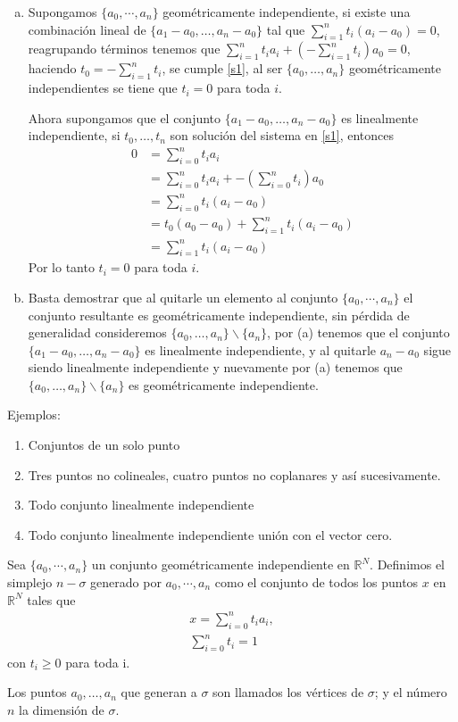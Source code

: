 \begin{Dem}
\begin{enumerate}[(a)]
\item Supongamos $\{a_0,\cdots,a_n\}$ geométricamente independiente, si existe una combinación lineal de $\{a_1-a_0,\ldots,a_n-a_0\}$ tal que $\sum_{i=1}^{n}t_i(a_i-a_0)=0$, reagrupando términos tenemos que $\sum_{i=1}^{n}t_ia_i + (-\sum_{i=1}^{n}t_i)a_0=0$, haciendo $t_0 = -\sum_{i=1}^{n}t_i$, se cumple \ref{s1}, al ser $\{a_0,\ldots,a_n\}$ geométricamente independientes se tiene que $t_i=0$ para toda $i$.

Ahora supongamos que el conjunto $\{a_1-a_0,\ldots,a_n-a_0\}$ es linealmente independiente, si $t_0,\ldots,t_n$ son solución del sistema en \ref{s1}, entonces 
\begin{align*}
 0&=\sum_{i=0}^{n}t_ia_i\\
 &=\sum_{i=0}^{n}t_ia_i + -(\sum_{i=0}^{n}t_i)a_0\\
 &=\sum_{i=0}^{n}t_i(a_i-a_0)\\ 
 &= t_0(a_0-a_0) + \sum_{i=1}^{n}t_i(a_i-a_0)\\
 &=\sum_{i=1}^{n}t_i(a_i-a_0)
\end{align*}
Por lo tanto $t_i=0$ para toda $i$.
\item Basta demostrar que al quitarle un elemento al conjunto $\{a_0,\cdots,a_n\}$
el conjunto resultante es geométricamente independiente, sin pérdida
de generalidad consideremos $\{a_0,\ldots,a_n\}\backslash\{a_n\}$, por (a) tenemos que el
conjunto $\{a_1-a_0,\ldots,a_n-a_0\}$ es linealmente independiente, y al quitarle
$a_n-a_0$ sigue siendo linealmente independiente y nuevamente por (a) 
tenemos que $\{a_0,\ldots,a_n\}\backslash\{a_n\}$ es geométricamente independiente.
\end{enumerate}
\end{Dem}
Ejemplos:
\begin{enumerate}
\item Conjuntos de un solo punto
\item Tres puntos no colineales, cuatro puntos no coplanares y así sucesivamente.  
\item Todo conjunto linealmente independiente
\item Todo conjunto linealmente independiente unión con el vector cero. 
\end{enumerate}

\begin{Defi}[Simplejo]
Sea $\{a_0,\cdots,a_n\}$ un conjunto geométricamente independiente en  $\mathbb{R}^{N}$. Definimos el simplejo  $n-\sigma$ generado por $a_0,\cdots,a_n$ como el conjunto de todos los puntos $x$ en $\mathbb{R}^{N}$ tales que 
\begin{equation}\label{s2}
\begin{split}
x = \sum_{i=0}^{n}t_ia_i,\\
\sum_{i=0}^{n}t_i=1
\end{split}
\end{equation}
con $t_i\geqslant 0$ para toda i.

Los puntos $a_0,\ldots,a_n$ que generan a $\sigma$ son llamados los vértices de $\sigma$; y el número $n$ la dimensión de $\sigma$.
\end{Defi}


